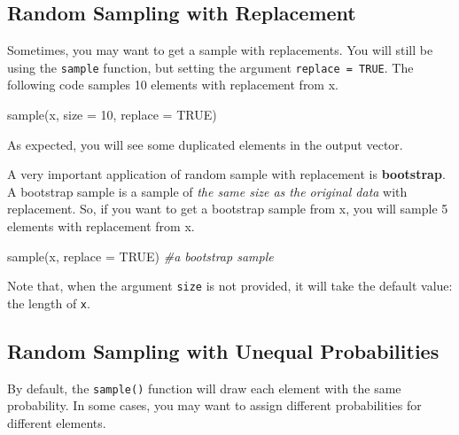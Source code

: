 \documentclass[
]{book}
\newenvironment{Shaded}{\begin{snugshade}}{\end{snugshade}}
\newcommand{\AttributeTok}[1]{\textcolor[rgb]{0.77,0.63,0.00}{#1}}
\newcommand{\CommentTok}[1]{\textcolor[rgb]{0.56,0.35,0.01}{\textit{#1}}}
\newcommand{\ConstantTok}[1]{\textcolor[rgb]{0.00,0.00,0.00}{#1}}
\newcommand{\DecValTok}[1]{\textcolor[rgb]{0.00,0.00,0.81}{#1}}
\newcommand{\FunctionTok}[1]{\textcolor[rgb]{0.00,0.00,0.00}{#1}}
\newcommand{\NormalTok}[1]{#1}
\newenvironment{blackbox}{
  \definecolor{shadecolor}{rgb}{0, 0, 0}  %
  \color{white}
  \begin{shaded}}
 {\end{shaded}}
\newenvironment{infobox}[1]
  {
  \begin{itemize}
  \renewcommand{\labelitemi}{
    \raisebox{-.7\height}[0pt][0pt]{
      {\setkeys{Gin}{width=3em,keepaspectratio}
        \texttt{[image: pics/\#1]}}
    }
  }
  \setlength{\fboxsep}{1em}
  \begin{blackbox}
  \item
  }
  {
  \end{blackbox}
  \end{itemize}
  }
\begin{document}
\hypertarget{random-sampling-with-replacement}{%
\subsection{Random Sampling with Replacement}\label{random-sampling-with-replacement}}

Sometimes, you may want to get a sample with replacements. You will still be using the \texttt{sample} function, but setting the argument \texttt{replace\ =\ TRUE}. The following code samples 10 elements with replacement from x.

\begin{Shaded}
\begin{Highlighting}[]
\FunctionTok{sample}\NormalTok{(x, }\AttributeTok{size =} \DecValTok{10}\NormalTok{, }\AttributeTok{replace =} \ConstantTok{TRUE}\NormalTok{)}
\end{Highlighting}
\end{Shaded}

As expected, you will see some duplicated elements in the output vector.

A very important application of random sample with replacement is \textbf{bootstrap}. A bootstrap sample is a sample of \emph{the same size as the original data} with replacement. So, if you want to get a bootstrap sample from x, you will sample 5 elements with replacement from x.

\begin{Shaded}
\begin{Highlighting}[]
\FunctionTok{sample}\NormalTok{(x, }\AttributeTok{replace =} \ConstantTok{TRUE}\NormalTok{) }\CommentTok{\#a bootstrap sample}
\end{Highlighting}
\end{Shaded}

\begin{infobox}{caution}
Note that, when the argument \texttt{size} is not provided, it will take the default value: the length of \texttt{x}.

\end{infobox}

\hypertarget{random-sampling-with-unequal-probabilities}{%
\subsection{Random Sampling with Unequal Probabilities}\label{random-sampling-with-unequal-probabilities}}

By default, the \texttt{sample()} function will draw each element with the same probability. In some cases, you may want to assign different probabilities for different elements.
\end{document}
